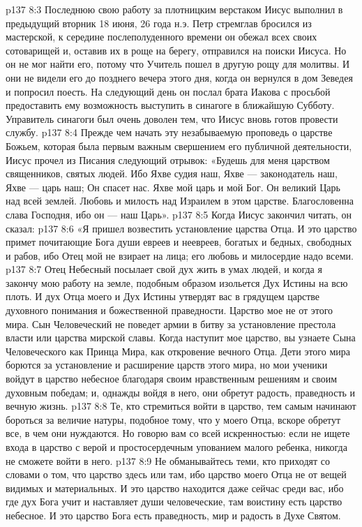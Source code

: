\vs p137 8:3 Последнюю свою работу за плотницким верстаком Иисус выполнил в предыдущий вторник 18 июня, 26 года н.э. Петр стремглав бросился из мастерской, к середине послеполуденного времени он обежал всех своих сотоварищей и, оставив их в роще на берегу, отправился на поиски Иисуса. Но он не мог найти его, потому что Учитель пошел в другую рощу для молитвы. И они не видели его до позднего вечера этого дня, когда он вернулся в дом Зеведея и попросил поесть. На следующий день он послал брата Иакова с просьбой предоставить ему возможность выступить в синагоге в ближайшую Субботу. Управитель синагоги был очень доволен тем, что Иисус вновь готов провести службу.
\vs p137 8:4 \pc Прежде чем начать эту незабываемую проповедь о царстве Божьем, которая была первым важным свершением его публичной деятельности, Иисус прочел из Писания следующий отрывок: «Будешь для меня царством священников, святых людей. Ибо Яхве судия наш, Яхве --- законодатель наш, Яхве --- царь наш; Он спасет нас. Яхве мой царь и мой Бог. Он великий Царь над всей землей. Любовь и милость над Израилем в этом царстве. Благословенна слава Господня, ибо он --- наш Царь».
\vs p137 8:5 Когда Иисус закончил читать, он сказал:
\vs p137 8:6 \pc «Я пришел возвестить установление царства Отца. И это царство примет почитающие Бога души евреев и неевреев, богатых и бедных, свободных и рабов, ибо Отец мой не взирает на лица; его любовь и милосердие надо всеми.
\vs p137 8:7 Отец Небесный посылает свой дух жить в умах людей, и когда я закончу мою работу на земле, подобным образом изольется Дух Истины на всю плоть. И дух Отца моего и Дух Истины утвердят вас в грядущем царстве духовного понимания и божественной праведности. Царство мое не от этого мира. Сын Человеческий не поведет армии в битву за установление престола власти или царства мирской славы. Когда наступит мое царство, вы узнаете Сына Человеческого как Принца Мира, как откровение вечного Отца. Дети этого мира борются за установление и расширение царств этого мира, но мои ученики войдут в царство небесное благодаря своим нравственным решениям и своим духовным победам; и, однажды войдя в него, они обретут радость, праведность и вечную жизнь.
\vs p137 8:8 Те, кто стремиться войти в царство, тем самым начинают бороться за величие натуры, подобное тому, что у моего Отца, вскоре обретут все, в чем они нуждаются. Но говорю вам со всей искренностью: если не ищете входа в царство с верой и простосердечным упованием малого ребенка, никогда не сможете войти в него.
\vs p137 8:9 Не обманывайтесь теми, кто приходят со словами о том, что царство здесь или там, ибо царство моего Отца не от вещей видимых и материальных. И это царство находится даже сейчас среди вас, ибо где дух Бога учит и наставляет души человеческие, там воистину есть царство небесное. И это царство Бога есть праведность, мир и радость в Духе Святом.
